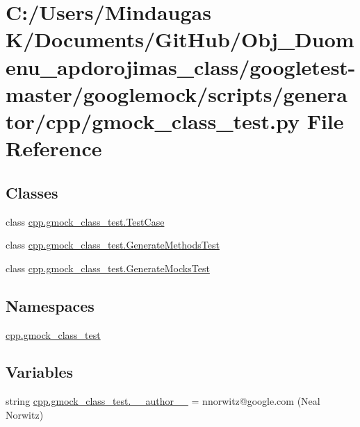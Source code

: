 \hypertarget{googletest-master_2googlemock_2scripts_2generator_2cpp_2gmock__class__test_8py}{}\section{C\+:/\+Users/\+Mindaugas K/\+Documents/\+Git\+Hub/\+Obj\+\_\+\+Duomenu\+\_\+apdorojimas\+\_\+class/googletest-\/master/googlemock/scripts/generator/cpp/gmock\+\_\+class\+\_\+test.py File Reference}
\label{googletest-master_2googlemock_2scripts_2generator_2cpp_2gmock__class__test_8py}
\subsection*{Classes}
\begin{DoxyCompactItemize}
\item 
class \mbox{\hyperlink{classcpp_1_1gmock__class__test_1_1_test_case}{cpp.\+gmock\+\_\+class\+\_\+test.\+Test\+Case}}
\item 
class \mbox{\hyperlink{classcpp_1_1gmock__class__test_1_1_generate_methods_test}{cpp.\+gmock\+\_\+class\+\_\+test.\+Generate\+Methods\+Test}}
\item 
class \mbox{\hyperlink{classcpp_1_1gmock__class__test_1_1_generate_mocks_test}{cpp.\+gmock\+\_\+class\+\_\+test.\+Generate\+Mocks\+Test}}
\end{DoxyCompactItemize}
\subsection*{Namespaces}
\begin{DoxyCompactItemize}
\item 
 \mbox{\hyperlink{namespacecpp_1_1gmock__class__test}{cpp.\+gmock\+\_\+class\+\_\+test}}
\end{DoxyCompactItemize}
\subsection*{Variables}
\begin{DoxyCompactItemize}
\item 
string \mbox{\hyperlink{namespacecpp_1_1gmock__class__test_a72474ac6fe2295f91f383e45b9b6e536}{cpp.\+gmock\+\_\+class\+\_\+test.\+\_\+\+\_\+author\+\_\+\+\_\+}} = \textquotesingle{}nnorwitz@google.\+com (Neal Norwitz)\textquotesingle{}
\end{DoxyCompactItemize}
